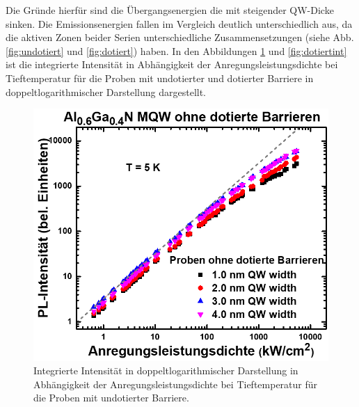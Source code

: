 \noindent 
Die Gründe hierfür sind die Übergangsenergien die mit steigender QW-Dicke \cite{doi:10.1063/1.371241} sinken. 
Die Emissionsenergien fallen im Vergleich deutlich unterschiedlich aus, da die aktiven Zonen beider Serien unterschiedliche Zusammensetzungen (siehe Abb. \ref{fig:undotiert} und \ref{fig:dotiert}) haben. 
\newline
In den Abbildungen \ref{fig:undotiertint} und \ref{fig:dotiertint} ist die integrierte Intensität in Abhängigkeit der Anregungsleistungsdichte bei Tieftemperatur für die Proben mit undotierter und dotierter Barriere in doppeltlogarithmischer Darstellung dargestellt.
\begin{figure}[H]
  \centering
  \begin{minipage}[t]{0.49\textwidth}
    \centering
    \includegraphics[width=\textwidth]{Bilder/MQWdickenSerie/intTTundotiert.png}
		\caption{Integrierte Intensität in doppeltlogarithmischer Darstellung in Abhängigkeit der Anregungsleistungsdichte bei Tieftemperatur für die Proben mit undotierter Barriere.}
    \label{fig:undotiertint}
  \end{minipage}
	\hfill
  \begin{minipage}[t]{0.49\textwidth}
    \centering

\end{minipage}
\end{figure}
